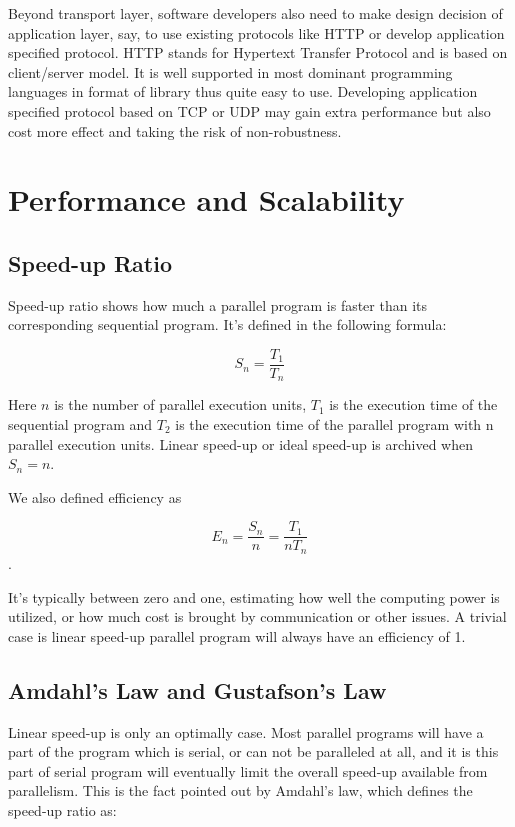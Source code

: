 \documentclass[12pt,a4]{report}
\begin{document}
Beyond transport layer, software developers also need to make design decision of application layer, say, to use existing protocols like HTTP or develop application specified protocol. HTTP stands for Hypertext Transfer Protocol and is based on client/server model. It is well supported in most dominant programming languages in format of library thus quite easy to use. Developing application specified protocol based on TCP or UDP may gain extra performance but also cost more effect and taking the risk of non-robustness.

\section{Performance and Scalability}

\subsection{Speed-up Ratio}

Speed-up ratio shows how much a parallel program is faster than its corresponding sequential program. It's defined in the following formula:

$$ S_n = \frac{T_1}{T_n} $$

Here $n$ is the number of parallel execution units, $T_1$ is the execution time of the sequential program and $T_2$ is the execution time of the parallel program with n parallel execution units. Linear speed-up or ideal speed-up is archived when $S_n = n$. 

We also defined efficiency as

$$ E_n = \frac{S_n}{n} = \frac{T_1}{nT_n} $$.

It's typically between zero and one, estimating how well the computing power is utilized, or how much cost is brought by communication or other issues. A trivial case is linear speed-up parallel program will always have an efficiency of 1.

\subsection{Amdahl's Law and Gustafson's Law}

Linear speed-up is only an optimally case. Most parallel programs will have a part of the program which is serial, or can not be paralleled at all, and it is this part of serial program will eventually limit the overall speed-up available from parallelism. This is the fact pointed out by Amdahl's law, which defines the speed-up ratio as:
\end{document}
